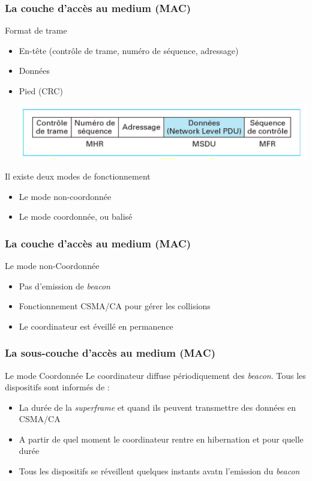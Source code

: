 \documentclass{beamer}
\begin{document}
  \begin{frame}
    \frametitle{La couche d'accès au medium (MAC)}
    \begin{block}{Format de trame}
      \begin{itemize}
        \item En-tête (contrôle de trame, numéro de séquence, adressage)
        \item Données
        \item Pied (CRC)
        \begin{center}
         \includegraphics[scale=0.5]{Couche-MAC.png}
        \end{center} 
      \end{itemize}
    \end{block}
    \begin{block}{Il existe deux modes de fonctionnement}
      \begin{itemize}
        \item Le mode non-coordonnée
        \item Le mode coordonnée, ou balisé
      \end{itemize}
    \end{block}
  \end{frame}
  
  \begin{frame}
    \frametitle{La couche d'accès au medium (MAC)}
    \begin{block}{Le mode non-Coordonnée}
      \begin{itemize}
        \item Pas d'emission de \textit{beacon}
        \item Fonctionnement CSMA/CA pour gérer les collisions
        \item Le coordinateur est éveillé en permanence
      \end{itemize}
    \end{block}
  \end{frame}

  \begin{frame}
    \frametitle{La sous-couche d'accès au medium (MAC)}
    \begin{block}{Le mode Coordonnée}
      Le coordinateur diffuse périodiquement des \textit{beacon}. Tous les dispositifs sont informés de :
      \begin{itemize}
        \item La durée de la \textit{superframe} et quand ils peuvent transmettre des données en CSMA/CA
        \item A partir de quel moment le coordinateur rentre en hibernation et pour quelle durée
        \item Tous les dispositifs se réveillent quelques instants avatn l'emission du \textit{beacon}
      \end{itemize}
    \end{block}
  \end{frame}
  
\end{document}
